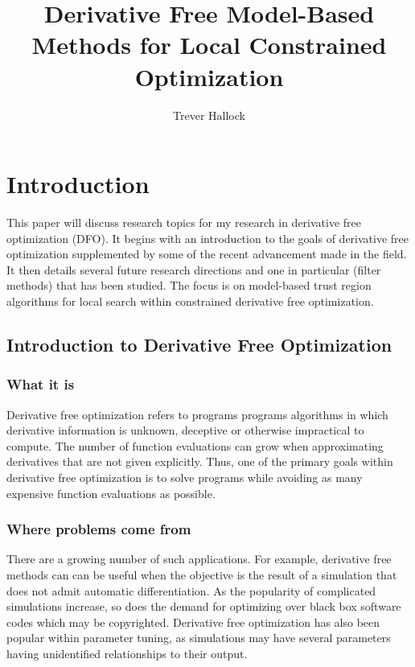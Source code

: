 \documentclass{article}
\title{Derivative Free Model-Based Methods for Local Constrained Optimization}
\author{Trever Hallock}
\begin{document}
%
\algnewcommand{\Goto}{\algorithmicgoto\xspace}%
\algnewcommand{\Label}{\State\unskip}


\maketitle


\tableofcontents

\section{Introduction}

This paper will discuss research topics for my research in derivative free optimization (DFO).
It begins with an introduction to the goals of derivative free optimization supplemented by some of the recent advancement made in the field.
It then details several future research directions and one in particular (filter methods) that has been studied.
The focus is on model-based trust region algorithms for local search within constrained derivative free optimization.

\subsection{Introduction to Derivative Free Optimization}
\subsubsection{What it is}

Derivative free optimization refers to programs programs algorithms in which derivative information is unknown, deceptive or otherwise impractical to compute.
The number of function evaluations can grow when approximating derivatives that are not given explicitly.
Thus, one of the primary goals within derivative free optimization is to solve programs while avoiding as many expensive function evaluations as possible.

\subsubsection{Where problems come from}

There are a growing number of such applications. For example, derivative free methods can can be useful when the objective is the result of a simulation that does not admit automatic differentiation.
As the popularity of complicated simulations increase, so does the demand for optimizing over black box software codes which may be copyrighted.
Derivative free optimization has also been popular within parameter tuning, as simulations may have several parameters having unidentified relationships to their output.
\end{document}
